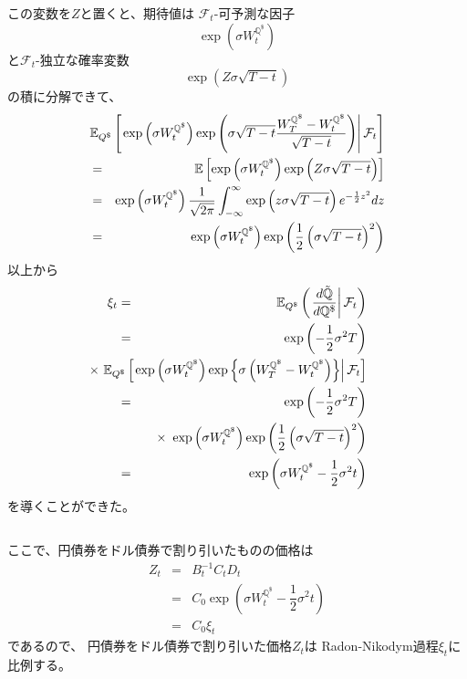 \documentclass[uplatex,a4j,12pt,dvipdfmx]{jsarticle}
\begin{document}
この変数を$Z$と置くと、期待値は
$\mathcal{F}_{t}$-可予測な因子
$$
	\exp
	\left(
	\sigma W^{\mathbb{Q}^{\$}}_{t}
	\right)
$$
と$\mathcal{F}_{t}$-独立な確率変数
$$
	\exp
	\left(
	Z \sigma \sqrt{T-t}
	\right)
$$
の積に分解できて、
%
%
\begin{eqnarray*}
	&&
	\hspace{-10mm}
	\mathbb{E}_{Q^{\$}}
	\left[
		\left.
		\exp
		\left(
		\sigma W^{\mathbb{Q}^{\$}}_{t}
		\right)
		\exp
		\left(
		\sigma
		\sqrt{T-t}
		\dfrac{
			W^{\mathbb{Q}^{\$}}_{T} - W^{\mathbb{Q}^{\$}}_{t}
		}
		{
			\sqrt{T-t}
		}
		\right)
		\right|
		\mathcal{F}_{t}
		\right]
	\\ &=&
	\mathbb{E}
	\left[
		\exp
		\left(
		\sigma W^{\mathbb{Q}^{\$}}_{t}
		\right)
		\exp
		\left(
		Z \sigma \sqrt{T-t}
		\right)
		\right]
	\\ &=&
	\exp
	\left(
	\sigma W^{\mathbb{Q}^{\$}}_{t}
	\right)
	\dfrac{1}{\sqrt{2 \pi}}
	\int^{\infty}_{- \infty}
	\exp
	\left(
	z \sigma \sqrt{T-t}
	\right)
	e^{- \frac{1}{2} z^{2}}
	dz
	\\ &=&
	\exp
	\left(
	\sigma W^{\mathbb{Q}^{\$}}_{t}
	\right)
	\exp
	\left(
	\dfrac{1}{2} \left( \sigma \sqrt{T-t} \right)^{2}
	\right)
\end{eqnarray*}
%
%
以上から
%
%
\begin{eqnarray*}
	\xi_{t}
	&=&
	\mathbb{E}_{Q^{\$}}
	\left(
	\left.
	\dfrac{d \tilde{\mathbb{Q}}}{d \mathbb{Q}^{\$}}
	\right|
	\mathcal{F}_{t}
	\right)
	\\ &=&
	\exp
	\left(
	- \dfrac{1}{2} \sigma^{2} T
	\right)
	\\ && \hspace{-15mm} \times \
	\mathbb{E}_{Q^{\$}}
	\left[
		\left.
		\exp
		\left(
		\sigma W^{\mathbb{Q}^{\$}}_{t}
		\right)
		\exp
		\left\{
		\sigma
		\left(
		W^{\mathbb{Q}^{\$}}_{T} - W^{\mathbb{Q}^{\$}}_{t}
		\right)
		\right\}
		\right|
		\mathcal{F}_{t}
		\right]
	\\ &=&
	\exp
	\left(
	- \dfrac{1}{2} \sigma^{2} T
	\right)
	\\ && \hspace{-15mm} \times \
	\exp
	\left(
	\sigma W^{\mathbb{Q}^{\$}}_{t}
	\right)
	\exp
	\left(
	\dfrac{1}{2} \left( \sigma \sqrt{T-t} \right)^{2}
	\right)
	\\ &=&
	\exp
	\left(
	\sigma W^{\mathbb{Q}^{\$}}_{t} - \dfrac{1}{2} \sigma^{2} t
	\right)
\end{eqnarray*}
%
%
を導くことができた。

${}$

ここで、円債券をドル債券で割り引いたものの価格は
%
%
\begin{eqnarray*}
	Z_{t}
	&=&
	B^{-1}_{t}
	C_{t}
	D_{t}
	\\ &=&
	C_{0}
	\exp
	\left(
	\sigma W^{\mathbb{Q}^{\$}}_{t} - \dfrac{1}{2} \sigma^{2} t
	\right)
	\\ &=&
	C_{0} \xi_{t}
\end{eqnarray*}
%
%
であるので、
円債券をドル債券で割り引いた価格$Z_{t}$は
Radon-Nikodym過程$\xi_{t}$に比例する。
\end{document}
